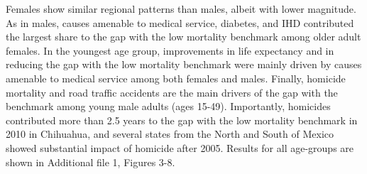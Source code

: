 \documentclass{bmcart}
\begin{document}
Females show similar regional patterns than males, albeit with lower magnitude. As in males, causes amenable to medical service, diabetes, and IHD contributed the largest share to the gap with the low mortality benchmark among older adult females. In the youngest age group, improvements in life expectancy and in reducing the gap with the low mortality benchmark were mainly driven by causes amenable to medical service among both females and males. Finally, homicide mortality and road traffic accidents are the main drivers of the gap with the benchmark among young male adults (ages 15-49). Importantly, homicides contributed more than 2.5 years to the gap with the low mortality benchmark in 2010 in Chihuahua, and several states from the North and South of Mexico showed substantial impact of homicide after 2005. Results for all age-groups are shown in Additional file 1, Figures 3-8.


\end{document}
